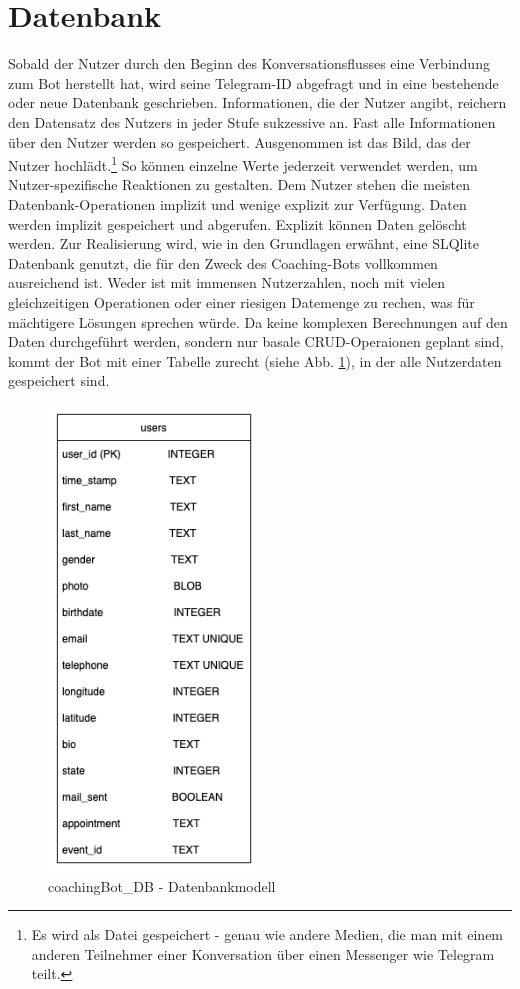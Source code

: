     
    \section{Datenbank} \label{Realisierung: Datenbank}
        Sobald der Nutzer durch den Beginn des Konversationsflusses eine Verbindung zum Bot herstellt hat, wird seine Telegram-ID abgefragt und in eine bestehende oder neue Datenbank geschrieben. Informationen, die der Nutzer angibt, reichern den Datensatz des Nutzers in jeder Stufe sukzessive an. Fast alle Informationen über den Nutzer werden so gespeichert. Ausgenommen ist das Bild, das der Nutzer hochlädt.\footnote{Es wird als Datei gespeichert - genau wie andere Medien, die man mit einem anderen Teilnehmer einer Konversation über einen Messenger wie Telegram teilt.} So können einzelne Werte jederzeit verwendet werden, um Nutzer-spezifische Reaktionen zu gestalten. Dem Nutzer stehen die meisten Datenbank-Operationen implizit und wenige explizit zur Verfügung. Daten werden implizit gespeichert und abgerufen. Explizit können Daten gelöscht werden. Zur Realisierung wird, wie in den Grundlagen erwähnt, eine SLQlite Datenbank genutzt, die für den Zweck des Coaching-Bots vollkommen ausreichend ist. Weder ist mit immensen Nutzerzahlen, noch mit vielen gleichzeitigen Operationen oder einer riesigen Datemenge zu rechen, was für mächtigere Lösungen sprechen würde. Da keine komplexen Berechnungen auf den Daten durchgeführt werden, sondern nur basale CRUD-Operaionen geplant sind, kommt der Bot mit einer Tabelle zurecht (siehe Abb. \ref{fig: data base model}), in der alle Nutzerdaten gespeichert sind.
        \begin{figure} %
            \centering
            \includegraphics[width=0.5\textwidth]{images/220325_PA28464_DataBaseModel.png}
            \caption{coachingBot\_DB - Datenbankmodell}
            \label{fig: data base model}
        \end{figure}


